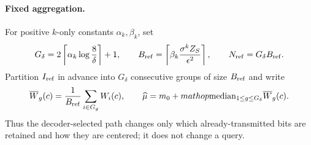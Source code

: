 \paragraph{Fixed aggregation.}
For positive $k$-only constants $\alpha_k,\beta_k$, set
\[
G_\delta=2\left\lceil\alpha_k\log\frac8\delta\right\rceil+1,
\qquad
B_{\rm ref}=\left\lceil\beta_k\frac{\sigma^kZ_S}{\epsilon^2}\right\rceil,
\qquad N_{\rm ref}=G_\delta B_{\rm ref}.
\]
Partition $I_{\rm ref}$ in advance into $G_\delta$ consecutive groups of
size $B_{\rm ref}$ and write
\[
\overline W_g(c)=\frac1{B_{\rm ref}}\sum_{i\in G_g}W_i(c),
\qquad
\widehat\mu=m_0+mathop{\rm median}_{1\leq g\leq G_\delta}
  \overline W_g(c).
\]
Thus the decoder-selected path changes only which already-transmitted bits are
retained and how they are centered; it does not change a query.
